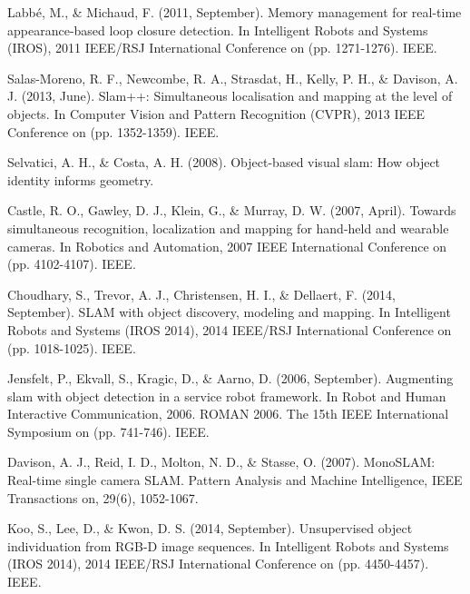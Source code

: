 \documentclass[twoside,hidelinks]{article}
\begin{document}
\begin{thebibliography}{9}
\newblock Labbé, M., \& Michaud, F. (2011, September). Memory management for real-time appearance-based loop closure detection. In Intelligent Robots and Systems (IROS), 2011 IEEE/RSJ International Conference on (pp. 1271-1276). IEEE.


\newblock Salas-Moreno, R. F., Newcombe, R. A., Strasdat, H., Kelly, P. H., \& Davison, A. J. (2013, June). Slam++: Simultaneous localisation and mapping at the level of objects. In Computer Vision and Pattern Recognition (CVPR), 2013 IEEE Conference on (pp. 1352-1359). IEEE.

\newblock Selvatici, A. H., \& Costa, A. H. (2008). Object-based visual slam: How object identity informs geometry.

\newblock Castle, R. O., Gawley, D. J., Klein, G., \& Murray, D. W. (2007, April). Towards simultaneous recognition, localization and mapping for hand-held and wearable cameras. In Robotics and Automation, 2007 IEEE International Conference on (pp. 4102-4107). IEEE.


\newblock Choudhary, S., Trevor, A. J., Christensen, H. I., \& Dellaert, F. (2014, September). SLAM with object discovery, modeling and mapping. In Intelligent Robots and Systems (IROS 2014), 2014 IEEE/RSJ International Conference on (pp. 1018-1025). IEEE.

\newblock Jensfelt, P., Ekvall, S., Kragic, D., \& Aarno, D. (2006, September). Augmenting slam with object detection in a service robot framework. In Robot and Human Interactive Communication, 2006. ROMAN 2006. The 15th IEEE International Symposium on (pp. 741-746). IEEE.

\newblock Davison, A. J., Reid, I. D., Molton, N. D., \& Stasse, O. (2007). MonoSLAM: Real-time single camera SLAM. Pattern Analysis and Machine Intelligence, IEEE Transactions on, 29(6), 1052-1067.

\newblock Koo, S., Lee, D., \& Kwon, D. S. (2014, September). Unsupervised object individuation from RGB-D image sequences. In Intelligent Robots and Systems (IROS 2014), 2014 IEEE/RSJ International Conference on (pp. 4450-4457). IEEE.





\end{thebibliography}
\end{document}
